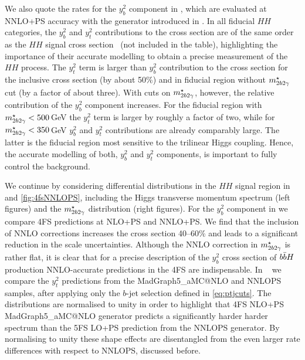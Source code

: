 \documentclass[11pt,a4paper]{article}
\begin{document}
We also quote the rates for the \bbH{} $y_b^2$ component in , which are evaluated at NNLO+PS 
accuracy with the \minnlo{} generator introduced in . 
In all fiducial $HH$ categories, the $y_b^2$ and $y_t^2$ contributions to the \bbH{} cross section are of the same order 
as the $HH$ signal cross section~\cite{manzoni:2023qaf} (not included in the table), highlighting the importance of their 
accurate modelling to obtain a precise measurement of the $HH$ process. 
The $y_t^2$ term is larger than $y_b^2$ contribution to the \bbH{} cross section for the inclusive cross section (by about 50\%) 
and in fiducial region without $m_{2b2\gamma}^{\star}$ cut (by a factor of about three). With cuts on $m_{2b2\gamma}^{\star}$, however, the relative contribution of the 
$y_b^2$ component increases. For the fiducial region with $m_{2b2\gamma}^{\star}<500$\,GeV the $y_t^2$ term is larger by roughly a factor of 
two, while for $m_{2b2\gamma}^{\star}<350$\,GeV $y_b^2$ and $y_t^2$ contributions are already comparably large. 
The latter is the fiducial region most sensitive to the trilinear Higgs coupling. Hence, the accurate modelling 
of both, $y_b^2$ and $y_t^2$ components, is important to fully control the \bbH{} background.

We continue by considering differential distributions in the $HH$ signal region in  and \ref{fig:4fsNNLOPS}, including 
the Higgs transverse momentum spectrum (left figures) and the $m_{2b2\gamma}^{\star}$ distribution (right figures).
For the $y_b^2$ component in  we compare 4FS predictions at NLO+PS and NNLO+PS. We find that the inclusion 
of NNLO corrections increases the cross section 40--60\% 
and leads to a significant reduction in the scale uncertainties. Although the NNLO correction in $m_{2b2\gamma}^{\star}$ is rather flat,
it is clear that for a precise description of the $y_b^2$ cross section of $b\bar{b}H{}$ production 
NNLO-accurate predictions in the 4FS are indispensable.
In ~ we compare the $y_t^2$ predictions from the {\sc MadGraph5\_aMC@NLO} and {\sc NNLOPS} samples, 
after applying only the $b$-jet selection defined in \eqref{eq:ptjcuts}. 
The distributions are normalised to unity in order to highlight that 4FS NLO+PS {\sc MadGraph5\_aMC@NLO} generator
predicts a significantly harder harder spectrum than the 5FS LO+PS prediction from the  {\sc NNLOPS} generator.
By normalising to unity these shape effects are disentangled from the even larger rate differences with respect to {\sc NNLOPS}, discussed before.

\end{document}
